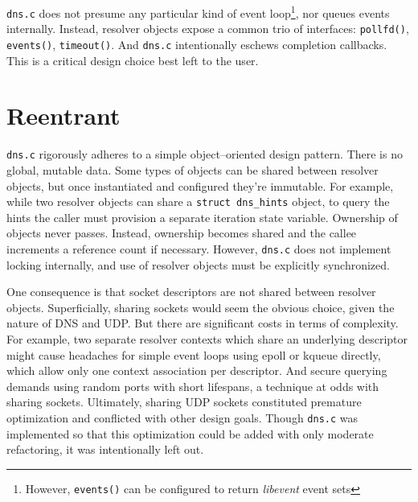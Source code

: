 \documentclass[11pt, oneside]{memoir}
\newcommand*{\dnsc}[0]{\texttt{dns.c}\xspace}
\newcommand*{\key}[1]{#1\index{#1}\xspace}
\newenvironment{todo}[1]{
	\begin{color}{red}
	\sf
	\begin{tabular}{|p{0.9\textwidth}|}
	\hline
	TODO---\uppercase{#1} \\\hline
	\index{TODO!\lowercase{#1}}
}{
	\\\hline
	\end{tabular}
	\end{color}
}
\begin{document}
\dnsc does not presume any particular kind of event loop\footnote{However, \texttt{events()} can be configured to return \textit{libevent} event sets}, nor queues events internally. Instead, resolver objects expose a common trio of interfaces: \texttt{pollfd()}, \texttt{events()}, \texttt{timeout()}. And \dnsc intentionally eschews completion callbacks. This is a critical design choice best left to the user.

\section{Reentrant}

\dnsc rigorously adheres to a simple object--oriented design pattern. There is no global, mutable data. Some types of objects can be shared between resolver objects, but once instantiated and configured they're immutable. For example, while two resolver objects can share a \texttt{struct dns\_hints} object, to query the hints the caller must provision a separate iteration state variable. Ownership of objects never passes. Instead, ownership becomes shared and the callee increments a reference count if necessary. However, \dnsc does not implement locking internally, and use of resolver objects must be explicitly synchronized.

One consequence is that socket descriptors are not shared between resolver objects. Superficially, sharing sockets would seem the obvious choice, given the nature of DNS and \key{UDP}. But there are significant costs in terms of complexity. For example, two separate resolver contexts which share an underlying descriptor might cause headaches for simple event loops using \key{epoll} or \key{kqueue} directly, which allow only one context association per descriptor. And secure querying demands using random ports with short lifespans, a technique at odds with sharing sockets. Ultimately, sharing \key{UDP} sockets constituted premature optimization and conflicted with other design goals. Though \dnsc was implemented so that this optimization could be added with only moderate refactoring, it was intentionally left out.


\end{document}
